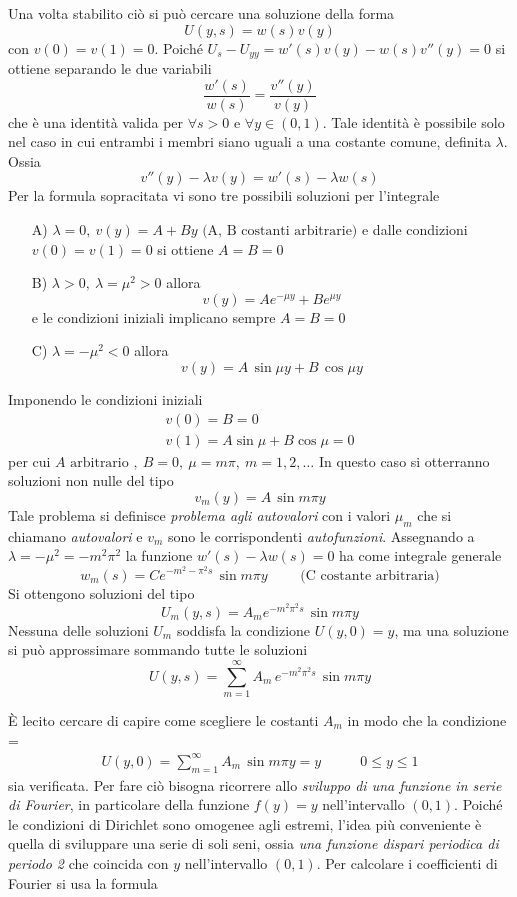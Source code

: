 \documentclass[a4paper,12pt, draft]{article}
\theoremstyle{break}
\numberwithin{equation}{section}
\begin{document}
Una volta stabilito ciò si può cercare una soluzione della forma $$
U(y,s) = w(s)v(y)
$$
con $v(0) = v(1) = 0$.
Poiché $U_s - U_{yy} = w'(s)v(y) - w(s)v''(y) = 0$
si ottiene separando le due variabili
\begin{equation}
\frac{w'(s)}{w(s)} = \frac{v''(y)}{v(y)}
\end{equation}
che è una identità valida per $\forall s > 0 \mbox{ e } \forall y \in (0,1)$.
Tale identità è possibile solo nel caso in cui entrambi i membri siano uguali a una costante comune, definita $\lambda$. Ossia $$
v''(y) - \lambda v(y) = w'(s) - \lambda w(s)$$
Per la formula sopracitata vi sono tre possibili soluzioni per l'integrale
\begin{itemize}
\item[A)] $\lambda = 0, \ v(y) = A +By \mbox{ (A, B costanti arbitrarie)}$ e dalle condizioni $v(0) = v(1) = 0$ si ottiene $A=B=0$
\item[B)] $\lambda > 0,\ \lambda = \mu^2 > 0$ allora $$
v(y) = Ae^{-\mu y} + Be^{\mu y}
$$
e le condizioni iniziali implicano sempre $A=B=0$
\item[C)] $\lambda = -\mu^2 < 0$ allora
$$
v(y) = A\, \sin{\mu y}+B\, \cos{\mu y}
$$
\end{itemize}
Imponendo le condizioni iniziali
\begin{eqnarray*}
v(0) = B = 0 \\
v(1) = A \sin{\mu} + B\cos{\mu} = 0
\end{eqnarray*}
per cui $A \mbox{ arbitrario }, \ B = 0, \ \mu = m\pi, \ m= 1,2, \ldots$
In questo caso si otterranno soluzioni non nulle del tipo 
$$
v_m(y) = A\, \sin{m} \pi y
$$
Tale problema si definisce \emph{problema agli autovalori} con i valori $\mu_m$ che si chiamano \emph{autovalori} e $v_m$ sono le corrispondenti \emph{autofunzioni}.
Assegnando a $\lambda = -\mu^2 = -m^2\pi^2$ la funzione $w'(s) - \lambda w(s) = 0$ ha come integrale generale
$$w_m(s) = Ce^{-m^2-\pi^2s} \, \sin{m\pi y} \qquad \mbox{ (C costante arbitraria)}$$ 
Si ottengono soluzioni del tipo 
$$
U_m(y,s) = A_me^{-m^2\pi^2s}\, \sin{m\pi y}
$$
Nessuna delle soluzioni $U_m$ soddisfa la condizione $U(y,0) = y$, ma una soluzione si può approssimare sommando tutte le soluzioni 
\begin{equation}
U(y,s) = \sum_{m=1}^{\infty} A_m \, e^{-m^2\pi^2s} \, \sin{m\pi y}
\end{equation}

È lecito cercare di capire come scegliere le costanti $A_m$ in modo che la condizione
{\everymath ={\displaystyle}
$$
\begin{array}{lr}
U(y,0) = \sum_{m=1}^{\infty} A_m  \, \sin{m\pi y} = y & \qquad
0 \leq y \leq 1
\end{array}
$$
}
sia verificata.   
Per fare ciò bisogna ricorrere allo \emph{sviluppo di una funzione in serie di Fourier}, in particolare della funzione $f(y) = y$ nell'intervallo $(0,1)$. Poiché le condizioni di Dirichlet sono omogenee agli estremi, l'idea più conveniente è quella di sviluppare una serie di soli seni, ossia \emph{una funzione dispari periodica di periodo 2} che coincida con $y$ nell'intervallo $(0,1)$.  
Per calcolare i coefficienti di Fourier si usa la formula
\end{document}
